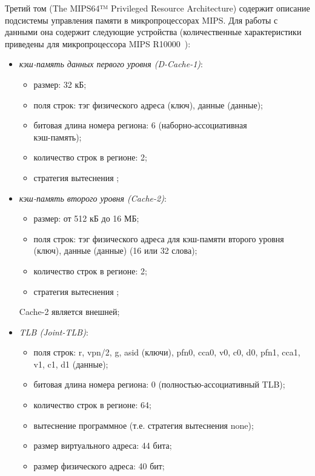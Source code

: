 Третий том (The MIPS64™ Privileged Resource Architecture) содержит описание подсистемы управления памяти в
микропроцессорах MIPS. Для работы с данными она содержит следующие устройства (количественные
характеристики приведены для микропроцессора MIPS R10000~\cite{R10000}):
\begin{itemize}
  \item \emph{кэш-память данных первого уровня (D-Cache-1)}:
        \begin{itemize}
            \item размер: 32 кБ;
            \item поля строк: тэг физического адреса (ключ), данные (данные);
            \item битовая длина номера региона: 6 (наборно-ассоциативная\\ кэш-память);
            \item количество строк в регионе: 2;
            \item стратегия вытеснения \LRU;
        \end{itemize}
  \item \emph{кэш-память второго уровня (Cache-2)}:
        \begin{itemize}
            \item размер: от 512 кБ до 16 МБ;
            \item поля строк: тэг физического адреса для кэш-памяти второго
уровня (ключ), данные (данные) (16 или 32 слова);
            \item количество строк в регионе: 2;
            \item стратегия вытеснения \LRU;
        \end{itemize}
         Cache-2 является внешней;
  \item \emph{TLB (Joint-TLB)}:
        \begin{itemize}
            \item поля строк: r, vpn/2, g, asid (ключи), pfn0, cca0, v0, c0, d0,
pfn1, cca1, v1, c1, d1 (данные);
            \item битовая длина номера региона: 0 (полностью-ассоциативный TLB);
            \item количество строк в регионе: 64;
            \item вытеснение программное (т.е. стратегия вытеснения none);
            \item размер виртуального адреса: 44 бита;
            \item размер физического адреса: 40 бит;
        \end{itemize}

\end{itemize}
